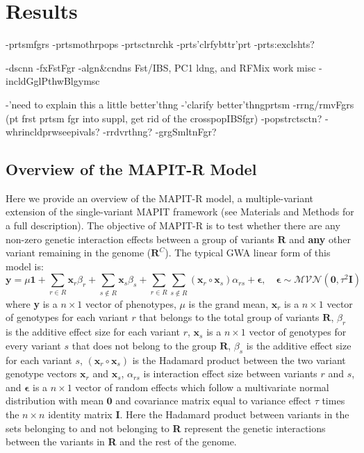 \documentclass[12pt,a4paper]{article}
\begin{document}
\section{Results}\label{InterPath-Results}

-prtsmfgrs
-prtsmothrpops
-prtsctnrchk
-prts'clrfybttr'prt
-prts:exclshts?

-dscnn
-fxFstFgr
-algn\&cndns Fst/IBS, PC1 ldng, and RFMix work misc
-incldGglPthwBlgymsc

-'need to explain this a little better'thng
-'clarify better'thngprtsm
-rrng/rmvFgrs (pt frst prtsm fgr into suppl, get rid of the crosspopIBSfgr)
-popstrctsctn?
-whrincldprwseepivals?
-rrdvrthng?
-grgSmltnFgr?

\subsection{Overview of the MAPIT-R Model}\label{InterPath-Results-MAPITRModel}

Here we provide an overview of the MAPIT-R model, a multiple-variant extension of the single-variant MAPIT framework (see Materials and Methods for a full description). The objective of MAPIT-R is to test whether there are any non-zero genetic interaction effects between a group of variants $\textbf{R}$ and \textbf{any} other variant remaining in the genome ($\textbf{R}^C$). The typical GWA linear form of this model is:  
\begin{equation}\label{Overview1}
\textbf{y} = \mu\textbf{1} + \sum_{r \in R} \textbf{x}_r\beta_r + \sum_{s \not\in R} \textbf{x}_s\beta_s + \sum_{r \in R}\sum_{s \not\in R} (\textbf{x}_r \circ \textbf{x}_s)\alpha_{rs} + \boldsymbol{\epsilon}, \quad \boldsymbol{\epsilon} \sim \mathcal{MVN}(\textbf{0}, \tau^{2}\textbf{I})  
\end{equation}
where \textbf{y} is a $n \times 1$ vector of phenotypes, $\mu$ is the grand mean, $\textbf{x}_r$ is a $n \times 1$ vector of genotypes for each variant $r$ that belongs to the total group of variants $\textbf{R}$, $\beta_r$ is the additive effect size for each variant $r$, $\textbf{x}_s$ is a $n \times 1$ vector of genotypes for every variant $s$ that does not belong to the group $\textbf{R}$, $\beta_s$ is the additive effect size for each variant $s$, $(\textbf{x}_r \circ \textbf{x}_s)$ is the Hadamard product between the two variant genotype vectors $\textbf{x}_r$ and $\textbf{x}_s$, $\alpha_{rs}$ is interaction effect size between variants $r$ and $s$, and $\boldsymbol{\epsilon}$ is a $n \times 1$ vector of random effects which follow a multivariate normal distribution with mean $\textbf{0}$ and covariance matrix equal to variance effect $\tau$ times the $n \times n$ identity matrix $\textbf{I}$. Here the Hadamard product between variants in the sets belonging to and not belonging to \textbf{R} represent the genetic interactions between the variants in \textbf{R} and the rest of the genome.
\end{document}
